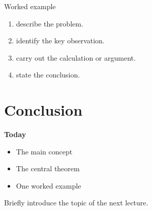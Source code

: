 \documentclass[11pt,aspectratio=169]{beamer}
\begin{document}
\begin{exampleframe}{Worked example}
  \begin{enumerate}
    \item<1->  describe the problem.
    \item<2->  identify the key observation.
    \item<3->  carry out the calculation or argument.
    \item<4->  state the conclusion.
  \end{enumerate}
\end{exampleframe}

\section{Conclusion}

\begin{summaryframe}
  \textbf{Today}
  \begin{itemize}
    \item[\coursecheck] The main concept
    \item[\coursecheck] The central theorem
    \item[\coursecheck] One worked example
  \end{itemize}

  \begin{importantbox}[Next]
    Briefly introduce the topic of the next lecture.
  \end{importantbox}
\end{summaryframe}
\end{document}
